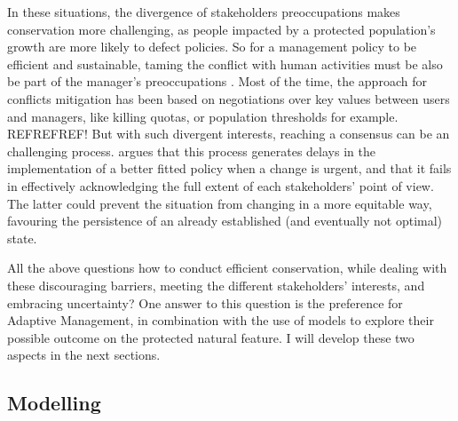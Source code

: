 \documentclass[12pt,a4paper]{article}
\begin{document}
In these situations, the divergence of stakeholders preoccupations makes conservation more challenging, as people impacted by a protected population's growth are more likely to defect policies.
So for a management policy to be efficient and sustainable, taming the conflict with human activities must be also be part of the manager's preoccupations \citep{redpath2013understanding}.
Most of the time, the approach for conflicts mitigation has been based on negotiations over key values between users and managers, like killing quotas, or population thresholds for example. REFREFREF!
But with such divergent interests, reaching a consensus can be an challenging process.
\cite{peterson2005conservation} argues that this process generates delays in the implementation of a better fitted policy when a change is urgent, and that it %
fails in effectively acknowledging the full extent of each stakeholders' point of view.
The latter could prevent the situation from changing in a more equitable way, favouring the persistence of an already established (and eventually not optimal) state.

All the above questions how to conduct efficient conservation, while dealing with these discouraging barriers, meeting the different stakeholders' interests, and embracing uncertainty?
One answer to this question is the preference for Adaptive Management, in combination with the use of models to explore their possible outcome on the protected natural feature.
I will develop these two aspects in the next sections.  

\subsection{Modelling}
\end{document}
